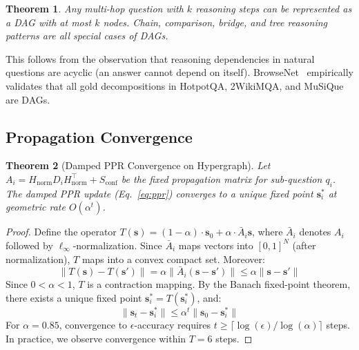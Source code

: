 \documentclass[11pt,a4paper]{article}
\newtheorem{theorem}{Theorem}
\begin{document}
\begin{theorem}
Any multi-hop question with $k$ reasoning steps can be represented as a DAG with at most $k$ nodes. Chain, comparison, bridge, and tree reasoning patterns are all special cases of DAGs.
\end{theorem}

This follows from the observation that reasoning dependencies in natural questions are acyclic (an answer cannot depend on itself). BrowseNet~\cite{browsenet2026} empirically validates that all gold decompositions in HotpotQA, 2WikiMQA, and MuSiQue are DAGs.

\subsection{Propagation Convergence}
\label{sec:convergence}

\begin{theorem}[Damped PPR Convergence on Hypergraph]
\label{thm:convergence}
Let $A_i = H_{\text{norm}} D_i H_{\text{norm}}^\top + S_{\text{conf}}$ be the fixed propagation matrix for sub-question $q_i$. The damped PPR update (Eq.~\ref{eq:ppr}) converges to a unique fixed point $\mathbf{s}_i^*$ at geometric rate $O(\alpha^t)$.
\end{theorem}

\begin{proof}
Define the operator $T(\mathbf{s}) = (1-\alpha) \cdot \mathbf{s}_0 + \alpha \cdot \bar{A}_i \mathbf{s}$, where $\bar{A}_i$ denotes $A_i$ followed by $\ell_\infty$-normalization. Since $\bar{A}_i$ maps vectors into $[0, 1]^N$ (after normalization), $T$ maps into a convex compact set. Moreover:
\begin{equation}
    \|T(\mathbf{s}) - T(\mathbf{s}')\| = \alpha \|\bar{A}_i(\mathbf{s} - \mathbf{s}')\| \leq \alpha \|\mathbf{s} - \mathbf{s}'\|
\end{equation}
Since $0 < \alpha < 1$, $T$ is a contraction mapping. By the Banach fixed-point theorem, there exists a unique fixed point $\mathbf{s}_i^* = T(\mathbf{s}_i^*)$, and:
\begin{equation}
    \|\mathbf{s}_t - \mathbf{s}_i^*\| \leq \alpha^t \|\mathbf{s}_0 - \mathbf{s}_i^*\|
\end{equation}
For $\alpha = 0.85$, convergence to $\epsilon$-accuracy requires $t \geq \lceil \log(\epsilon) / \log(\alpha) \rceil$ steps. In practice, we observe convergence within $T = 6$ steps.
\end{proof}
\end{document}
